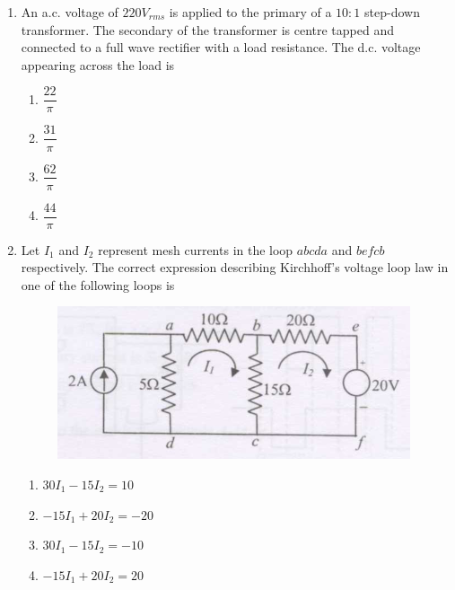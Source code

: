 \documentclass[journal,12pt,onecolumn]{IEEEtran}
\theoremstyle{remark}
\begin{document}
\begin{enumerate}
\item An a.c. voltage of $220{V_{rms}}$ is applied to the primary of a $10:1$ step-down transformer. The secondary of the transformer is centre tapped and connected to a full wave rectifier with a load resistance. The d.c. voltage appearing across the load is
\hfill{}
\begin{multicols}{4}
\begin{enumerate}
    \item $\dfrac{22}{\pi}$
    \item $\dfrac{31}{\pi}$
    \item $\dfrac{62}{\pi}$
    \item $\dfrac{44}{\pi}$
\end{enumerate}
\end{multicols}

\item Let $I_1$ and $I_2$ represent mesh currents in the loop $abcda$ and $befcb$ respectively. The correct expression describing Kirchhoff's voltage loop law in one of the following loops is
\begin{figure}[H]
    \centering
    \includegraphics[width = 0.6\columnwidth]{fig/Q.66.png}
    \caption*{}
    \label{fig:Q.66}
\end{figure}
\hfill{}
\begin{multicols}{2}
\begin{enumerate}
    \item $30 I_1 - 15 I_2 = 10$
    \item $-15 I_1 + 20 I_2 = -20$
    \item $30 I_1 - 15 I_2 = -10$
    \item $-15 I_1 + 20 I_2 = 20$
\end{enumerate}
\end{multicols}


\end{enumerate}
\end{document}
